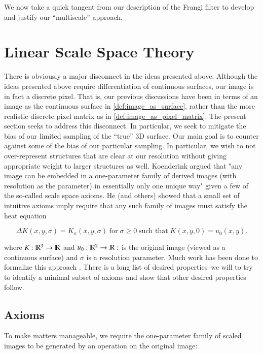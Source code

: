 	We now take a quick tangent from our description of the Frangi filter to develop and justify our ``multiscale'' approach.
	
        
    \section{Linear Scale Space Theory} \label{sec:scale-space-theory}
    
    
    There is obviously a major disconnect in the ideas presented above. 
    Although the ideas presented above require differentiation of continuous
    surfaces, our image is in fact a discrete pixel. That is, our previous discussions have been in terms of an image as the continuous surface in \cref{def:image_as_surface},
    rather than the more realistic discrete pixel matrix as in \cref{def:image_as_pixel_matrix}.
    The present section seeks to address this disconnect.
    In particular, we seek to mitigate the bias of our limited sampling
    of the ``true'' 3D surface. Our main goal is to counter against some of the bias of our particular sampling. In particular, we wish to not over-represent structures that
    are clear at our resolution without giving appropriate weight to larger structures as well.
    Koenderink \cite{Koenderink} argued that "any image can be embedded in a one-parameter family of derived images (with resolution as the parameter) in essentially only one unique way" given a few of the so-called scale space axioms. He (and others) showed that a small set of intuitive axioms imply require that any such family of images must satisfy the heat equation
    
    \begin{equation} \label{eq:heat-eq-for-family}
    \Delta K(x,y,\sigma) = K_\sigma (x,y,\sigma) 
    \;\text{for}\; \sigma \ge 0
    \;\text{such that}\; K(x,y, 0) = u_0(x,y).
    \end{equation}
    
    where $K: \mathbb{R}^3 \to \mathbb{R} $ and  $u_0: \mathbb{R}^2 \to \mathbb{R}: $ is the original image (viewed as a continuous surface) and $\sigma$ is a resolution parameter.
    Much work has been done to formalize this approach \cite{GSST-book}. There is a long list of desired properties--we will to try to identify a minimal subset of axioms and show that other desired properties follow.
    
	  
    
    \subsection{Axioms}
	 To make matters manageable, we require the one-parameter family of scaled images to be generated by an operation on the original image:
	 
